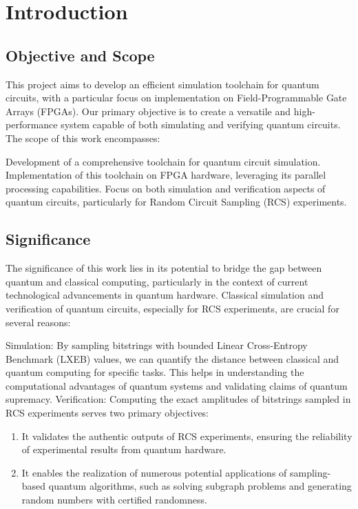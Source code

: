 \documentclass[12pt,oneside,a4paper]{article}
\begin{document}
\tableofcontents
\newpage

\section{Introduction}

\subsection{Objective and Scope}
This project aims to develop an efficient simulation toolchain for quantum circuits, with a particular focus on implementation on Field-Programmable Gate Arrays (FPGAs). Our primary objective is to create a versatile and high-performance system capable of both simulating and verifying quantum circuits.
The scope of this work encompasses:

Development of a comprehensive toolchain for quantum circuit simulation.
Implementation of this toolchain on FPGA hardware, leveraging its parallel processing capabilities.
Focus on both simulation and verification aspects of quantum circuits, particularly for Random Circuit Sampling (RCS) experiments.

\subsection{Significance}
The significance of this work lies in its potential to bridge the gap between quantum and classical computing, particularly in the context of current technological advancements in quantum hardware.
Classical simulation and verification of quantum circuits, especially for RCS experiments, are crucial for several reasons:

Simulation: By sampling bitstrings with bounded Linear Cross-Entropy Benchmark (LXEB) values, we can quantify the distance between classical and quantum computing for specific tasks. This helps in understanding the computational advantages of quantum systems and validating claims of quantum supremacy.
Verification: Computing the exact amplitudes of bitstrings sampled in RCS experiments serves two primary objectives:
\begin{enumerate}
	\item It validates the authentic outputs of RCS experiments, ensuring the reliability of experimental results from quantum hardware.
	\item It enables the realization of numerous potential applications of sampling-based quantum algorithms, such as solving subgraph problems and generating random numbers with certified randomness.
\end{enumerate}
\end{document}
